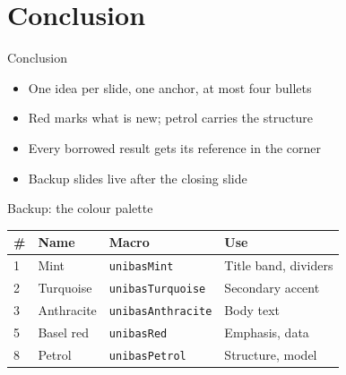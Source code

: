 \documentclass{unibaselbeamer}
\begin{document}
\section{Conclusion}

\begin{frame}{Conclusion}
  \begin{itemize}
    \item One idea per slide, one anchor, at most four bullets
    \item Red marks what is new; petrol carries the structure
    \item Every borrowed result gets its reference in the corner
    \item Backup slides live after the closing slide
  \end{itemize}
\end{frame}


\backupbegin

\begin{frame}{Backup: the colour palette}
  \begin{center}
    \begin{tabular}{@{}llll@{}}
      \toprule
      \# & Name & Macro & Use \\
      \midrule
      1 & Mint       & \texttt{unibasMint}       & Title band, dividers \\
      2 & Turquoise  & \texttt{unibasTurquoise}  & Secondary accent \\
      3 & Anthracite & \texttt{unibasAnthracite} & Body text \\
      5 & Basel red  & \texttt{unibasRed}        & Emphasis, data \\
      8 & Petrol     & \texttt{unibasPetrol}     & Structure, model \\
      \bottomrule
    \end{tabular}
  \end{center}
\end{frame}

\nocite{*}
\bibliographypage

\backupend
\end{document}
